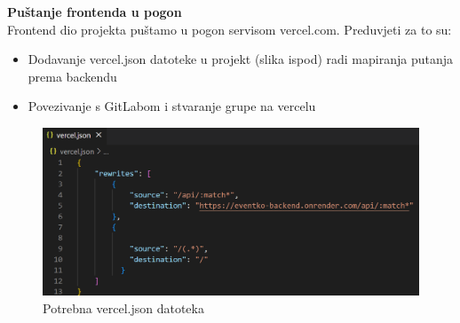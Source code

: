 			\noindent \textbf{Puštanje frontenda u pogon}\\
			
			\indent Frontend dio projekta puštamo u pogon servisom vercel.com. Preduvjeti za to su:
			\begin{itemize}
				\item Dodavanje vercel.json datoteke u projekt (slika ispod) radi mapiranja putanja prema backendu
				\item Povezivanje s GitLabom i stvaranje grupe na vercelu
			\end{itemize}
		
			\begin{figure}[H]
				\includegraphics[width=\textwidth]{Opis deploymenta/Slika7.png}
				\caption{Potrebna vercel.json datoteka}
			\end{figure}
			\eject
			
